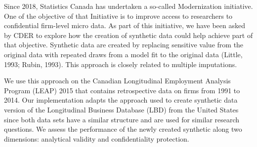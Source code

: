 \documentclass{article}
\begin{document}
Since 2018, Statistics Canada has undertaken a so-called Modernization initiative. One of the objective of that Initiative is to improve access to researchers to confidential firm-level micro data. As part of this initiative, we have been asked by CDER to explore how the creation of synthetic data could help achieve part of that objective. Synthetic data are created by replacing sensitive value from the original data with repeated draws from a model fit to the original data (Little, 1993; Rubin, 1993). This approach is closely related to multiple imputations. 

We use this approach on the Canadian Longitudinal Employment Analysis Program (LEAP) 2015 that contains retrospective data on firms from 1991 to 2014. Our implementation adapts the approach used to create synthetic data version of the Longitudinal Business Database (LBD) from the United States since both data sets have a similar structure and are used for similar research questions. We assess the performance of the newly created synthetic along two dimensions: analytical validity and confidentiality protection.
\end{document}
